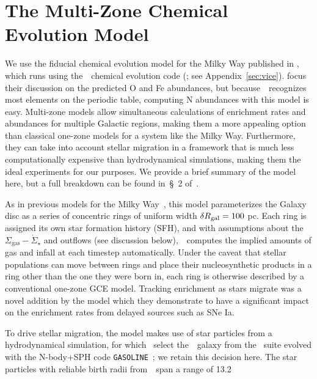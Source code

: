 \documentclass[ms.tex]{subfiles}
\begin{document}
\section{The Multi-Zone Chemical Evolution Model}
\label{sec:multizone}

We use the fiducial chemical evolution model for the Milky Way published in
\citet{Johnson2021}, which runs using the~\vice~chemical evolution code
(\citealp{Johnson2020, Griffith2021a}; see Appendix~\ref{sec:vice}).
\citet{Johnson2021} focus their discussion on the predicted O and Fe
abundances, but because~\vice~recognizes most elements on the periodic table,
computing N abundances with this model is easy.
Multi-zone models allow simultaneous calculations of enrichment rates and
abundances for multiple Galactic regions, making them a more appealing option
than classical one-zone models for a system like the Milky Way.
Furthermore, they can take into account stellar migration in a framework that
is much less computationally expensive than hydrodynamical simulations, making
them the ideal experiments for our purposes.
We provide a brief summary of the model here, but a full breakdown can be found
in~\S~2 of~\citet{Johnson2021}.
\par
As in previous models for the Milky Way~\citep[e.g.][]{Matteucci1989,
Schoenrich2009, Minchev2013, Minchev2014, Minchev2017, Sharma2021}, this model
parameterizes the Galaxy disc as a series of concentric rings of uniform width
$\delta R_\text{gal} = 100$ pc.
Each ring is assigned its own star formation history (SFH), and with
assumptions about the~$\Sigma_\text{gas}-\dot{\Sigma}_\star$ and outflows (see
discussion below),~\vice~computes the implied amounts of gas and infall at each
timestep automatically.
Under the caveat that stellar populations can move between rings and place
their nucleosynthetic products in a ring other than the one they were born in,
each ring is otherwise described by a conventional one-zone GCE model.
Tracking enrichment as stars migrate was a novel addition by the
\citet{Johnson2021} model which they demonstrate to have a significant impact
on the enrichment rates from delayed sources such as SNe Ia.
\par
To drive stellar migration, the model makes use of star particles from a
hydrodynamical simulation, for which~\citet{Johnson2021} select the~\hsim~galaxy
from the~\citet{Christensen2012} suite evolved with the N-body+SPH code
\texttt{GASOLINE}~\citep[][SPH: Smoothed Particle Hydrodynamics]{Wadsley2004};
we retain this decision here.
The star particles with reliable birth radii from~\hsim~span a range of 13.2
\end{document}
